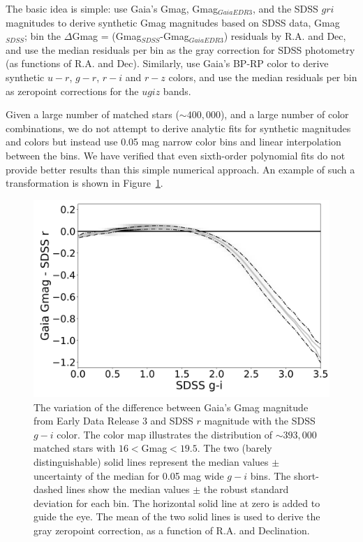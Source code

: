 \documentclass[fleqn,usenatbib]{mnras}
\begin{document}
The basic idea is simple: use Gaia's Gmag, Gmag$_{GaiaEDR3}$, and the SDSS $gri$ magnitudes
to derive synthetic Gmag magnitudes based on SDSS data, Gmag$_{SDSS}$; bin the 
$\Delta$Gmag = (Gmag$_{SDSS}$-Gmag$_{GaiaEDR3}$) residuals by R.A. and Dec, and 
use the median residuals per bin as the gray correction for SDSS photometry (as functions
of R.A. and Dec). Similarly, use Gaia's BP-RP color to derive synthetic $u-r$, $g-r$, $r-i$
and $r-z$ colors, and use the median residuals per bin as zeropoint corrections for 
the $ugiz$ bands. 

Given a large number of matched stars ($\sim 400,000$), and a large number of color combinations,
we do not attempt to derive analytic fits for synthetic magnitudes and colors but instead
use 0.05 mag narrow color bins and linear interpolation between the bins. We have verified
that even sixth-order polynomial fits do not provide better results than this simple 
numerical approach. An example of such a transformation is shown in Figure~\ref{fig:GrVSgi}. 


\begin{figure}
  \centering\includegraphics[width=0.95\columnwidth]{figures/GrVSgi.png} 
\caption{The variation of the difference between Gaia's Gmag magnitude from Early Data Release 3
and SDSS $r$ magnitude with the SDSS $g-i$ color.
The  color map illustrates the distribution of $\sim 393,000$ matched stars with 
$16<$Gmag$<19.5$. The two (barely distinguishable) solid lines represent the median 
values $\pm$ uncertainty of the median for 0.05 mag wide $g-i$ bins. The short-dashed 
lines show the median values $\pm$ the robust standard deviation for 
each bin. The horizontal solid line at zero is added to guide the eye. The mean of 
the two solid lines is used to derive the gray zeropoint correction, as a function of R.A.
and Declination.}
\label{fig:GrVSgi}
\end{figure}
\end{document}

